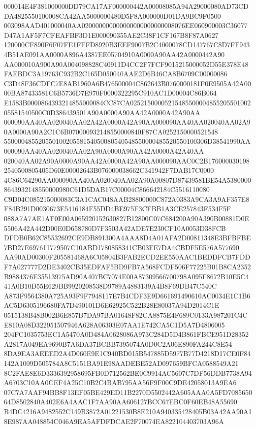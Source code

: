 \documentclass[UTF8,fontset=fandol,zihao=-4,a4paper]{ctexart}
\begin{document}
{{000014E4F381000000DD79CA17AF000000442A00008085A94A29000080AD73CDDA4825550100008CA42AA5000000480D5F8A000000D01DA9BC9F0500
003098AAD401000040AA020000000000000000000000008076EE060900003C36077D47A1AF5F7CFEAFBF3D1E000090355AE2C38F1CF167B8F87A0627
120000CF890F6F07FE1FFFD8920B3EEF9007B2C4000078CD147767C8D7FF9434B51AE091AA0000A896A4387EE05704910A0000A90AA42A0000442A90
AA000010A900A90A004098828C40911D4CC2F7FCF9015215000052D55E378E48FAEBDC3A19763C932B2C165D050040AAE2D6B46CA8B6709C00000086
C3D48F36CDFC7E8AB1960A6B476500004C862643B0760000181F0E9505A42A0000BA87433581C6B5736D7E970F0000322295C910AC1D00004C86B064
E1583B0000864393214855000084CC87CA0252150000521548550000485520550100205581540500C0D386439501A90A0000A90AA42A0000A42A90AA
000090AA40AA020040AA02A42A0000A42A90AA000090AA40AA020040AA02A90A0000A90A2C1C6B070000932148550000840F87CA0252150000521548
55000048552055010020558154050080540548550000485520550100306D38541990AA000090AA40AA020040AA02A90A0000A90AA42A0000A42A40AA
020040AA02A90A0000A90AA42A0000A42A90AA000090AAC0C2B1760000301982540500805405D60E00002643B076000038662C341942F7DAB17C0000
4C86C64290AA000090AA40AA020040AA02A90A00807D87439581BE54A53800008643932148550000980C61D5DAB17C00004C866642184C5516110080
C9D04C085215000083C3A1CAC048AAB28800000C872A0383A9CA3A9AF357E8F84B291D0030673E5416184F55DD4BE975F3CFBB1A3CE257843F534F5F
088A7A7AE1AF0E00A065920152630827B12800C07C684200A90A390B00881D0E5506A42A442D00E0D658780D7F3503A42ADE7E230CF10A0053D38FCB
DFDB0B62C85532692CE9DB891300A4AAA8D4A01AFA2D00811348E3BFBFBE7BD27E697611779507C10ABD1780858341CB03FE7DA4CBDF5E576A577690
AA90AD00300F205581468A6C05804B3FAB2ECD2EE550AAC1BEDDFCB7FDDF7A027777D2DE3402CB35EDFAF5BD9FB7A568FCDF506F77225B01B8CA2352
B9884376E35513975AD90A407BC7074E00A87309566700798A095F8672B10E5C441A0B10D55E629BB9920208538D9789A4883139A4B8F69DB47C540C
A873F9564380A725A93F9F7948117E7B4CDF3E9D661691490610AC0034E1C1B6AC5D6305196680FA7D490101D6E62925C522B28E80037A94D2014C1E
0515138B48B002B6E857B7DA97BA01648F82CA8875E4F689C0133A987201C4CE810A08D322951507946A628A06303E07AA1E742CA5C1D5A7D4806005
204FC1035753EC1A5470A0D484A0628086A973C284D5D4B861FBCE951D28352A2817A049EA9690B7A6DA37BCBB7395074A0D0C2A06E890FA244C8E54
8DA9EA3AEEED2A4D060E9E1C940BD015B547885D5977B77D4218D17CE0F84142A1009D505784A8C5151BA91E98AADEBE52AD097659BFCA0588549A21
8C2FAE8E6D3336392958695FB0D712562BE0C9914AC5607C7DF56DDB7738A94A6703C10AA0CEF4A25C10B2C4BAB795AA56F9F00C9DE42058013A9EA6
07C7A7AAF94BB8F13EF05BE429ED11B2270D5502442A605AAA0A5FD708565064D8502840A402E6A4AAC1F7AA90AA606127BCC67EBC0F60EB48A55690
B4DC4216A9482552C149B3872A01221530B8E210A940335428405B03A42AA90A18E987AA048854C046A9EA5AFDFDCAE2F70074EA822104403703A96A
}}
\end{document}
